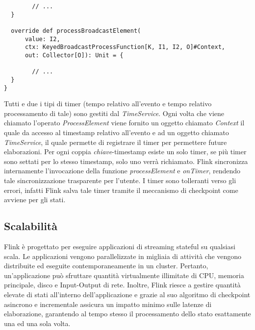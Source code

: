 {\begin{verbatim}
      	// ...
  }
  
  override def processBroadcastElement(
      value: I2, 
      ctx: KeyedBroadcastProcessFunction[K, I1, I2, O]#Context, 
      out: Collector[O]): Unit = {
      
      	// ...
  }
}
\end{verbatim}

\label{sec:timer}
Tutti e due i tipi di timer (tempo relativo all'evento e tempo relativo processamento di tale) sono gestiti dal \textit{TimeService}. Ogni volta che viene chiamato l'operato \textit{ProcessElement} viene fornito un oggetto chiamato \textit{Context} il quale da accesso al \gls{timestamp} relativo all'evento e ad un oggetto chiamato \textit{TimeService}, il quale permette di registrare il timer per permettere future elaborazioni. Per ogni coppia \textit{chiave}-\gls{timestamp} esiste un solo timer, se più timer sono settati per lo stesso \gls{timestamp}, solo uno verrà richiamato. Flink sincronizza internamente l'invocazione della funzione \textit{processElement} e \textit{onTimer}, rendendo tale sincronizzazione trasparente per l'utente. I timer sono tolleranti verso gli errori, infatti Flink salva tale timer tramite il meccanismo di \gls{checkpoint} come avviene per gli stati.


\subsection{Scalabilità}
Flink è progettato per eseguire applicazioni di streaming \gls{stateful} su qualsiasi scala. Le applicazioni vengono parallelizzate in migliaia di attività che vengono distribuite ed eseguite contemporaneamente in un \gls{cluster}. Pertanto, un'applicazione può sfruttare quantità virtualmente illimitate di CPU, memoria principale, disco e Input-Output di rete. Inoltre, Flink riesce a gestire quantità elevate di stati all'interno dell'applicazione e grazie al suo algoritmo di checkpoint asincrono e incrementale assicura un impatto minimo sulle latenze di elaborazione, garantendo al tempo stesso il processamento dello stato esattamente una ed una sola volta.

}
